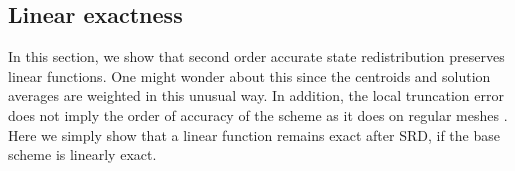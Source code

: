 







\subsection{Linear exactness} \label{sec:linex}
In this section, we show that second order accurate state redistribution preserves linear functions.
One might wonder about this since the centroids and solution averages are weighted in this unusual way.
In addition, the local truncation error does not imply the order of
accuracy of the scheme  as it does on regular meshes \cite{Kreiss:white2}. 
Here we simply show that a
linear function remains exact after SRD, if the base scheme is linearly
exact.

